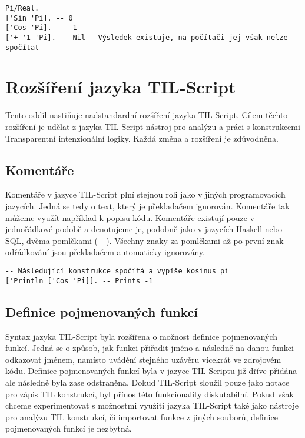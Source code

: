 \begin{lstlisting}[caption={Příklad využití symbolických hodnot}]
Pi/Real.
['Sin 'Pi]. -- 0
['Cos 'Pi]. -- -1
['+ '1 'Pi]. -- Nil - Výsledek existuje, na počítači jej však nelze spočítat
\end{lstlisting}

\section{Rozšíření jazyka TIL-Script}

Tento oddíl nastiňuje nadstandardní rozšíření jazyka TIL-Script. Cílem těchto rozšíření je udělat
z jazyka TIL-Script nástroj pro analýzu a práci s konstrukcemi Transparentní intenzionální logiky.
Každá změna a rozšíření je zdůvodněna.

\subsection{Komentáře}

Komentáře v jazyce TIL-Script plní stejnou roli jako v jiných programovacích jazycích. Jedná se tedy
o text, který je překladačem ignorován. Komentáře tak můžeme využít například k popisu kódu.
Komentáře existují pouze v jednořádkové podobě a denotujeme je, podobně jako v jazycích Haskell
nebo SQL, dvěma pomlčkami (\lstinline{--}). Všechny znaky za pomlčkami až po první znak odřádkování
jsou překladačem automaticky ignorovány.

\begin{lstlisting}[caption={Příklad využití komentářů}]
-- Následující konstrukce spočítá a vypíše kosinus pi
['Println ['Cos 'Pi]]. -- Prints -1
\end{lstlisting}

\subsection{Definice pojmenovaných funkcí}\label{fn-definition}

Syntax jazyka TIL-Script byla rozšířena o možnost definice pojmenovaných funkcí. Jedná se o způsob,
jak funkci přiřadit jméno a následně na danou funkci odkazovat jménem, namísto uvádění stejného
uzávěru vícekrát ve zdrojovém kódu. Definice pojmenovaných funkcí byla v jazyce TIL-Scriptu již
dříve přidána ale následně byla zase odstraněna\cite{vyletelek}. Dokud TIL-Script sloužil pouze
jako notace pro zápis TIL konstrukcí, byl přínos této funkcionality diskutabilní. Pokud však
chceme experimentovat s možnostmi využití jazyka TIL-Script také jako nástroje pro analýzu TIL
konstrukcí, či importovat funkce z jiných souborů, definice pojmenovaných funkcí je nezbytná.

